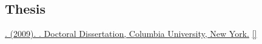 \subsection*{Thesis}
\label{sec:thesis}

\begin{description}
  \item \href{https://jdmonaco.com/files/monaco-phdthesis-2009.pdf}
    {. (2009). . Doctoral Dissertation, Columbia University, New York.}
  \href{https://search.proquest.com/docview/304862872/abstract}
  {}
  \href{https://jdmonaco.com/files/monaco-phdthesis-2009.pdf}{[]}
\end{description}

